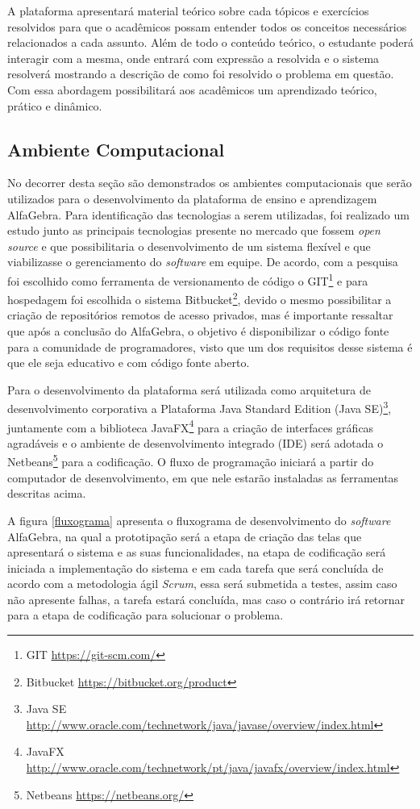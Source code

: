 A plataforma apresentará material teórico sobre cada tópicos e exercícios resolvidos para que o acadêmicos possam entender todos os conceitos necessários relacionados a cada assunto. Além de todo o conteúdo teórico, o estudante poderá interagir com a mesma, onde entrará com expressão a resolvida e o sistema resolverá mostrando a descrição de como foi resolvido o problema em questão. Com essa abordagem possibilitará aos acadêmicos um aprendizado teórico, prático e dinâmico.

\subsection{Ambiente Computacional}
\noindent No decorrer desta seção são demonstrados os ambientes computacionais que serão utilizados para o desenvolvimento da plataforma de ensino e aprendizagem AlfaGebra. Para identificação das tecnologias a serem utilizadas, foi realizado um estudo junto as principais tecnologias presente no mercado que fossem \textit{open source} e que possibilitaria o desenvolvimento de um sistema flexível e que viabilizasse o gerenciamento do \textit{software} em equipe. De acordo, com a pesquisa foi escolhido como ferramenta de versionamento de código o GIT\footnote[4]{GIT \url{https://git-scm.com/}} e para hospedagem foi escolhida o sistema Bitbucket\footnote[5]{Bitbucket \url{https://bitbucket.org/product}}, devido o mesmo possibilitar a criação de repositórios remotos de acesso privados, mas é importante ressaltar que após a conclusão do AlfaGebra, o objetivo é disponibilizar o código fonte para a comunidade de programadores, visto que um dos requisitos desse sistema é que ele seja educativo e com código fonte aberto.

Para o desenvolvimento da plataforma será utilizada como arquitetura de desenvolvimento corporativa a {Plataforma Java Standard Edition} (Java SE)\footnote[6]{Java SE \url{http://www.oracle.com/technetwork/java/javase/overview/index.html}}, juntamente com a biblioteca JavaFX\footnote[7]{JavaFX \url{http://www.oracle.com/technetwork/pt/java/javafx/overview/index.html}} para a criação de interfaces gráficas agradáveis e o ambiente de desenvolvimento integrado (IDE) será adotada o Netbeans\footnote[8]{Netbeans \url{https://netbeans.org/}} para a codificação. O fluxo de programação iniciará a partir do computador de desenvolvimento, em que nele estarão instaladas as ferramentas descritas acima.

A figura \ref{fluxograma} apresenta o fluxograma de desenvolvimento do \textit{software} AlfaGebra, na qual a prototipação será a etapa de criação das telas que apresentará o sistema e as suas funcionalidades, na etapa de codificação será iniciada a implementação do sistema e em cada tarefa que será concluída de acordo com a metodologia ágil \textit{Scrum}, essa será submetida a testes, assim caso não apresente falhas, a tarefa estará concluída, mas caso o contrário irá retornar para a etapa de codificação para solucionar o problema.

